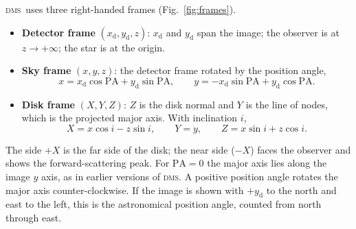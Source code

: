 \documentclass[11pt,a4paper]{article}
\newcommand{\dms}{\textsc{dms}}
\begin{document}
\dms\ uses three right-handed frames (Fig.~\ref{fig:frames}).
\begin{itemize}
\item \textbf{Detector frame} $(x_\mathrm{d}, y_\mathrm{d}, z)$: $x_\mathrm{d}$ and
      $y_\mathrm{d}$ span the image; the observer is at $z\to+\infty$; the star is at the origin.
\item \textbf{Sky frame} $(x, y, z)$: the detector frame rotated by the position angle,
\begin{equation}
x = x_\mathrm{d}\cos\mathrm{PA} + y_\mathrm{d}\sin\mathrm{PA},\qquad
y = -x_\mathrm{d}\sin\mathrm{PA} + y_\mathrm{d}\cos\mathrm{PA}.
\end{equation}
\item \textbf{Disk frame} $(X, Y, Z)$: $Z$ is the disk normal and $Y$ is the line of nodes, which
      is the projected major axis. With inclination $i$,
\begin{equation}
X = x\cos i - z\sin i,\qquad Y = y,\qquad Z = x\sin i + z\cos i .
\end{equation}
\end{itemize}
The side $+X$ is the far side of the disk; the near side ($-X$) faces the observer and shows the
forward-scattering peak. For $\mathrm{PA}=0$ the major axis lies along the image $y$ axis, as in
earlier versions of \dms. A positive position angle rotates the major axis counter-clockwise. If
the image is shown with $+y_\mathrm{d}$ to the north and east to the left, this is the
astronomical position angle, counted from north through east.
\end{document}
